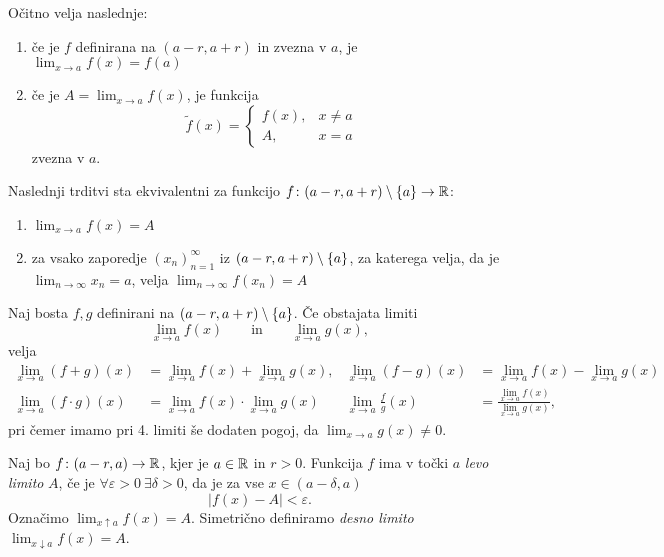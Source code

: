\documentclass[12pt, a4paper]{article}
\begin{document}
\begin{posledica}
Očitno velja naslednje:

\begin{enumerate}[label=\roman*)]
\item če je $f$ definirana na $(a-r,a+r)$ in zvezna v $a$, je $\displaystyle\lim_{x\to a}f(x)=f(a)$
\item če je $A=\displaystyle\lim_{x\to a}f(x)$, je funkcija
\[
\widetilde{f}(x)=\begin{cases}
f(x), &x\ne a
\\
A, &x=a
\end{cases}
\]
zvezna v $a$.
\end{enumerate}
\end{posledica}

\begin{izrek}
Naslednji trditvi sta ekvivalentni za funkcijo $f\colon(a-r,a+r)\setminus\left\{a\right\}\to\mathbb{R}$:

\begin{enumerate}[label=\roman*)]
\item $\displaystyle\lim_{x\to a}f(x)=A$
\item za vsako zaporedje $(x_n)_{n=1}^\infty$ iz $(a-r,a+r)\setminus\left\{a\right\}$, za katerega velja, da je $\displaystyle\lim_{n\to\infty}x_n=a$, velja $\displaystyle\lim_{n\to\infty}f\left(x_n\right)=A$
\end{enumerate}
\end{izrek}

\begin{trditev}
Naj bosta $f,g$ definirani na $(a-r,a+r)\setminus\left\{a\right\}$. Če obstajata limiti
\[
\lim_{x\to a} f(x)\qquad\text{in}\qquad \lim_{x\to a} g(x),
\]
velja
\begin{align*}
\lim_{x\to a} (f+g)(x)&=\lim_{x\to a} f(x)+\lim_{x\to a} g(x), & \lim_{x\to a} (f-g)(x)&=\lim_{x\to a} f(x)-\lim_{x\to a} g(x)
\\
\lim_{x\to a} (f\cdot g)(x)&=\lim_{x\to a} f(x)\cdot \lim_{x\to a} g(x) & \lim_{x\to a} \frac{f}{g}(x)&=\frac{\displaystyle\lim_{x\to a} f(x)}{\displaystyle\lim_{x\to a} g(x)},
\end{align*}
pri čemer imamo pri 4. limiti še dodaten pogoj, da $\displaystyle\lim_{x\to a}g(x)\ne 0$.
\end{trditev}

\begin{definicija}
Naj bo $f\colon (a-r,a)\to\mathbb{R}$, kjer je $a\in\mathbb{R}$ in $r>0$. Funkcija $f$ ima v točki $a$ \emph{levo limito} $A$, če je $\forall\varepsilon>0~\exists\delta>0$, da je za vse $x\in(a-\delta,a)$
\[
\left|f(x)-A\right|<\varepsilon.
\]
Označimo $\displaystyle\lim_{x\uparrow a}f(x)=A$. Simetrično definiramo \emph{desno limito} $\displaystyle\lim_{x\downarrow a}f(x)=A$.
\end{definicija}
\end{document}
